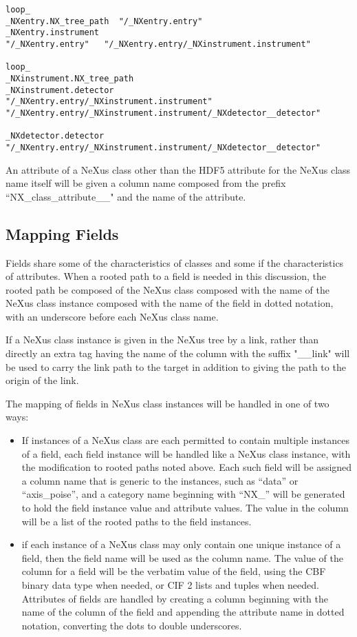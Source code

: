 \documentclass[11pt]{article}
\begin{document}
{{\begin{verbatim}
loop_
_NXentry.NX_tree_path  "/_NXentry.entry"
_NXentry.instrument   
"/_NXentry.entry"   "/_NXentry.entry/_NXinstrument.instrument"

loop_
_NXinstrument.NX_tree_path 
_NXinstrument.detector   
"/_NXentry.entry/_NXinstrument.instrument" "/_NXentry.entry/_NXinstrument.instrument/_NXdetector__detector"

_NXdetector.detector "/_NXentry.entry/_NXinstrument.instrument/_NXdetector__detector"
\end{verbatim}

An attribute of a NeXus class other than the HDF5 attribute for the NeXus class name itself
will be given a 
column name composed from the prefix ``NX\_class\_attribute\_\_" and the name of the attribute.


\subsection{Mapping Fields}
\label{Mapping Fields}

Fields share some of the characteristics of classes and some if the
characteristics of attributes.  When a rooted path to a field is needed
in this discussion, the rooted path be composed of the NeXus class 
composed with the name of the NeXus class instance composed with the name of
the field in dotted notation, with an underscore before each NeXus class name.

If a NeXus class instance is given in the NeXus tree by a link, rather than directly an extra tag
having the name of the column with the suffix "\_\_link" will be used to carry
the link path to the target in addition to giving the path to the origin of the link.

The mapping of fields in NeXus class instances will be handled in one
of two ways:
\begin{itemize}

\item{If instances of a NeXus class are each permitted to contain multiple
instances of a field, each field instance will be handled like a
NeXus class instance, with the modification to rooted paths noted above.
Each such field will be assigned a column name that is generic to the instances,
such as ``data'' or ``axis\_poise'', and a category name beginning with ``NX\_'' will
be generated to hold the field instance value and attribute values.  The
value in the column will be a list of the rooted paths to the field instances.}

\item{if each instance of a NeXus class may only contain one unique
instance of a field, then the field name will be used as the column name.
The value of the column for a field will be the verbatim
value of the field, using the CBF binary data type when needed, or CIF 2 lists and tuples
when needed.  Attributes of fields are handled by creating a column beginning with the name of
the column of the field and appending the attribute name in dotted notation,
converting the dots to double underscores.}


\end{itemize}}}
\end{document}
